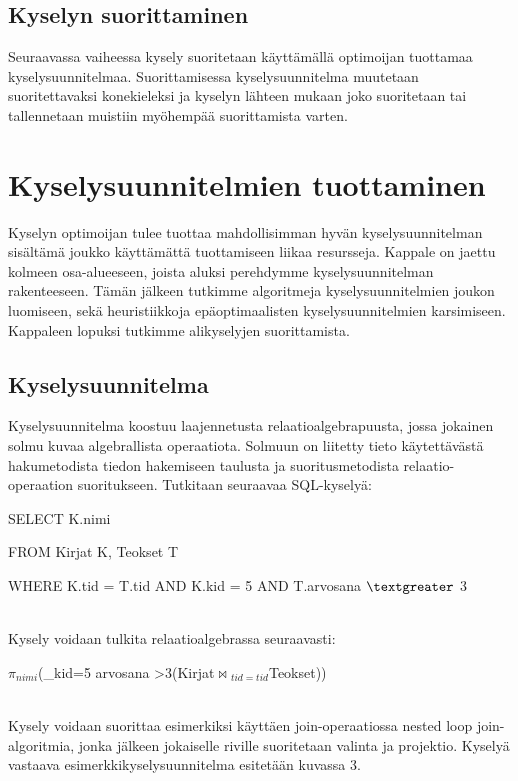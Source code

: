 \documentclass[finnish]{tktltiki2}
\theoremstyle{definition}
\theoremstyle{remark}
\begin{document}
\subsection{Kyselyn suorittaminen}
Seuraavassa vaiheessa kysely suoritetaan käyttämällä optimoijan tuottamaa kyselysuunnitelmaa. Suorittamisessa kyselysuunnitelma muutetaan suoritettavaksi konekieleksi ja kyselyn lähteen mukaan joko suoritetaan tai tallennetaan muistiin myöhempää suorittamista varten. 

\section{Kyselysuunnitelmien tuottaminen} %
Kyselyn optimoijan tulee tuottaa mahdollisimman hyvän kyselysuunnitelman sisältämä joukko käyttämättä tuottamiseen liikaa resursseja. Kappale on jaettu kolmeen osa-alueeseen, joista aluksi perehdymme kyselysuunnitelman rakenteeseen. Tämän jälkeen tutkimme algoritmeja kyselysuunnitelmien joukon luomiseen, sekä heuristiikkoja epäoptimaalisten kyselysuunnitelmien karsimiseen. Kappaleen lopuksi tutkimme alikyselyjen suorittamista.

\subsection{Kyselysuunnitelma}
Kyselysuunnitelma koostuu laajennetusta relaatioalgebrapuusta, jossa jokainen solmu kuvaa algebrallista operaatiota. Solmuun on liitetty tieto käytettävästä hakumetodista tiedon hakemiseen taulusta ja suoritusmetodista relaatio-operaation suoritukseen. Tutkitaan seuraavaa SQL-kyselyä:

\begin{frame}

SELECT K.nimi

FROM Kirjat K, Teokset T

WHERE K.tid = T.tid AND K.kid = 5 AND T.arvosana $\textgreater$  3
\end{frame}
\\\newline
Kysely voidaan tulkita relaatioalgebrassa seuraavasti:

\begin{frame}

$\pi$$_{nimi}$(\sigma_{kid=5 \wedge arvosana \textgreater 3}(Kirjat$\Join$$ _{tid=tid}$Teokset))
\end{frame}
\\\newline
Kysely voidaan suorittaa esimerkiksi käyttäen join-operaatiossa nested loop join-algoritmia, jonka jälkeen jokaiselle riville suoritetaan 
valinta ja projektio. Kyselyä vastaava esimerkkikyselysuunnitelma esitetään kuvassa 3.
\end{document}
